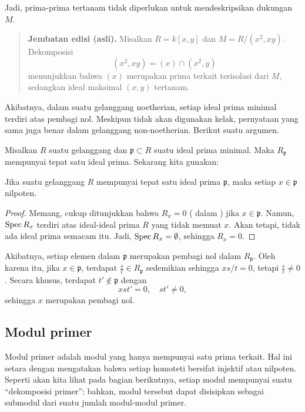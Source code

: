 Jadi, prima-prima tertanam tidak diperlukan untuk mendeskripsikan dukungan $M$. 

\begin{quote}\small\textbf{Jembatan edisi (asli).}
Misalkan $R=k[x,y]$ dan $M=R/(x^2,xy)$. Dekomposisi
\[
  (x^2,xy)=(x)\cap(x^2,y)
\]
menunjukkan bahwa $(x)$ merupakan prima terkait terisolasi dari $M$, sedangkan ideal
maksimal $(x,y)$ tertanam.\end{quote}

\begin{remark} 
Akibatnya, dalam suatu gelanggang noetherian, setiap ideal prima minimal terdiri atas
pembagi nol. Meskipun tidak akan digunakan kelak, pernyataan yang sama juga benar
dalam gelanggang non-noetherian. Berikut suatu argumen.

Misalkan $R$ suatu gelanggang dan $\mathfrak{p} \subset R$ suatu ideal prima minimal. Maka
$R_{\mathfrak{p}}$ mempunyai tepat satu ideal prima.
Sekarang kita gunakan:

\begin{lemma} 
Jika suatu gelanggang $R$ mempunyai tepat satu ideal prima $\mathfrak{p}$, maka setiap $x \in
\mathfrak{p}$ nilpoten.
\end{lemma} 
\begin{proof} 
Memang, cukup ditunjukkan bahwa $R_x = 0$ ( dalam
) jika $x \in
\mathfrak{p}$. Namun, $\operatorname{Spec} R_x$
terdiri atas ideal-ideal prima $R$ yang tidak memuat $x$. Akan tetapi, tidak ada ideal prima semacam itu.
Jadi, $\operatorname{Spec} R_x = \emptyset$, sehingga $R_x = 0$.
\end{proof} 

Akibatnya, setiap elemen dalam $\mathfrak{p}$ merupakan pembagi nol dalam
$R_{\mathfrak{p}}$.
Oleh karena itu, jika $x \in \mathfrak{p}$, terdapat $\frac{s}{t} \in
R_{\mathfrak{p}}$ sedemikian sehingga $xs/t = 0$, tetapi $\frac{s}{t} \neq 0$.
Secara khusus, terdapat $t' \notin \mathfrak{p}$ dengan 
\[ xst' = 0, \quad st' \neq 0,  \]
sehingga $x$ merupakan pembagi nol. 
\end{remark}



\subsection{Modul primer}

Modul primer adalah modul yang hanya mempunyai satu prima terkait. Hal ini setara
dengan mengatakan bahwa setiap homoteti bersifat injektif atau nilpoten. 
Seperti akan kita lihat pada bagian berikutnya, setiap modul mempunyai suatu “dekomposisi
primer”: bahkan, modul tersebut dapat disisipkan sebagai submodul dari suatu jumlah modul-modul
primer.

